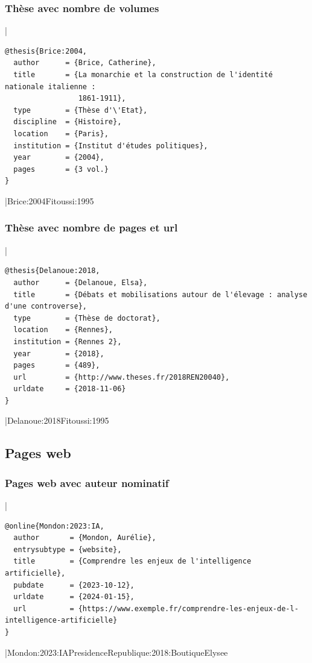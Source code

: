 \documentclass{article}
\begin{document}
\subsubsection{Thèse avec nombre de volumes}

|
\begin{verbatim}
@thesis{Brice:2004,
  author      = {Brice, Catherine},
  title       = {La monarchie et la construction de l'identité nationale italienne :
                 1861-1911},
  type        = {Thèse d'\'Etat},
  discipline  = {Histoire},
  location    = {Paris},
  institution = {Institut d'études politiques},
  year        = {2004},
  pages       = {3 vol.}
}
\end{verbatim}
|{Brice:2004}{Fitoussi:1995}

\subsubsection{Thèse avec nombre de pages et url}

|
\begin{verbatim}
@thesis{Delanoue:2018,
  author      = {Delanoue, Elsa},
  title       = {Débats et mobilisations autour de l'élevage : analyse d'une controverse},
  type        = {Thèse de doctorat},
  location    = {Rennes},
  institution = {Rennes 2},
  year        = {2018},
  pages       = {489},
  url         = {http://www.theses.fr/2018REN20040},
  urldate     = {2018-11-06}
}
\end{verbatim}
|{Delanoue:2018}{Fitoussi:1995}

\subsection{Pages web}

\subsubsection{Pages web avec auteur nominatif}

|
\begin{verbatim}
@online{Mondon:2023:IA,
  author       = {Mondon, Aurélie},
  entrysubtype = {website},
  title        = {Comprendre les enjeux de l'intelligence artificielle},
  pubdate      = {2023-10-12},
  urldate      = {2024-01-15},
  url          = {https://www.exemple.fr/comprendre-les-enjeux-de-l-intelligence-artificielle}
}
\end{verbatim}
|{Mondon:2023:IA}{PresidenceRepublique:2018:BoutiqueElysee}
\end{document}
